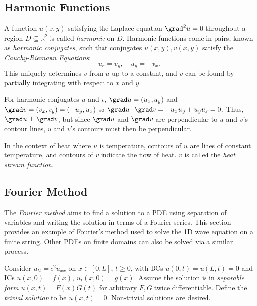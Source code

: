 \documentclass[10pt, a4paper]{article}
\begin{document}
\begin{landscape}
\begin{multicols*}{2}
    \section{Harmonic Functions}

    A function \(u(x, y)\) satisfying the Laplace equation \(\grad^2 u = 0\) throughout a region
    \(D \subseteq \mathbb{R}^2\) is called \emph{harmonic} on \(D\). Harmonic functions come in
    pairs, known as \emph{harmonic conjugates}, such that conjugates \(u(x, y), v(x, y)\) satisfy the
    \emph{Cauchy-Riemann Equations}:
    \[
        u_x = v_y,
        \quad
        u_y = -v_x.
        \tag{on \(D\)}
    \]
    This uniquely determines \(v\) from \(u\) up to a constant, and \(v\) can be found by partially integrating
    with respect to \(x\) and \(y\).

    For harmonic conjugates \(u\) and \(v\), \(\grad u = (u_x, u_y)\) and \(\grad v = (v_x, v_y) = (-u_y, u_x)\) so
    \(\grad u \cdot \grad v = -u_x u_y + u_y u_x = 0\). Thus, \(\grad u \perp \grad v\), but since \(\grad u\) and
    \(\grad v\) are perpendicular to \(u\) and \(v\)'s contour lines, \(u\) and \(v\)'s contours must then be
    perpendicular. 

    In the context of heat where \(u\) is temperature, contours of \(u\) are lines of constant temperature, and 
    contours of \(v\) indicate the flow of heat. \(v\) is called the \emph{heat stream function}.

\end{multicols*}

\pagebreak

\begin{multicols*}{2}
    
    \section{Fourier Method}

    The \emph{Fourier method} aims to find a solution to a PDE using separation of variables and writing the
    solution in terms of a Fourier series. This section provides an example of Fourier's method used to
    solve the 1D wave equation on a finite string. Other PDEs on finite domains can also be solved via
    a similar process.

    Consider \(u_{tt} = c^2 u_{xx}\) on \(x \in [0, L]\), \(t \geq 0\), with BCs
    \(u(0, t) = u(L, t) = 0\) and ICs \(u(x, 0) = f(x)\), \(u_t(x, 0) = g(x)\).
    Assume the solution is in \emph{separable form} \(u(x, t) = F(x) G(t)\) for arbitrary \(F, G\) twice differentiable.
    Define the \emph{trivial solution} to be \(u(x, t) = 0\). Non-trivial solutions are desired.


\end{multicols*}
\end{landscape}
\end{document}

